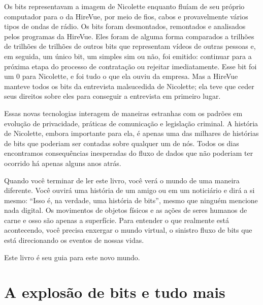 Os bits representavam a imagem de Nicolette enquanto fluíam de seu próprio
computador para o da HireVue, por meio de fios, cabos e provavelmente vários
tipos de ondas de rádio. Os bits foram desmontados, remontados e analisados
pelos programas da HireVue. Eles foram de alguma forma comparados a trilhões de
trilhões de trilhões de outros bits que representam vídeos de outras pessoas e,
em seguida, um único bit, um simples sim ou não, foi emitido: continuar para a
próxima etapa do processo de contratação ou rejeitar imediatamente. Esse bit foi
um $0$ para Nicolette, e foi tudo o que ela ouviu da empresa. Mas a HireVue
manteve todos os bits da entrevista malsucedida de Nicolette; ela teve que ceder
seus direitos sobre eles para conseguir a entrevista em primeiro lugar.

Essas novas tecnologias interagem de maneiras estranhas com os padrões em
evolução de privacidade, práticas de comunicação e legislação criminal. A
história de Nicolette, embora importante para ela, é apenas uma das milhares de
histórias de bits que poderiam ser contadas sobre qualquer um de nós. Todos os
dias encontramos consequências inesperadas do fluxo de dados que não poderiam
ter ocorrido há apenas alguns anos atrás.

Quando você terminar de ler este livro, você verá o mundo de uma maneira 
diferente. Você ouvirá uma história de um amigo ou em um noticiário e dirá a si 
mesmo: ``Isso é, na verdade, uma história de bits'', mesmo que ninguém mencione
nada digital. Os movimentos de objetos físicos e as ações de seres humanos de 
carne e osso são apenas a superfície. Para entender o que realmente está 
acontecendo, você precisa enxergar o mundo virtual, o sinistro fluxo de bits 
que está direcionando os eventos de nossas vidas.

Este livro é seu guia para este novo mundo.

\section{A explosão de bits e tudo mais}
\label{cap1:exp-dig-bits}

